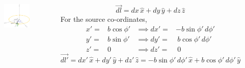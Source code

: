 \documentclass[10pt,aspectratio=169]{beamer}
\begin{document}
	\begin{frame}
		\begin{columns}
			\begin{figure}[!htb]
				\centering
				\includegraphics[scale=0.5]{b-components-dl}
			\end{figure}
			\pause
			\[ \vec{dl} = dx\, \hat{x} + dy\, \hat{y} + dz\, \hat{z} \]
			\pause
			For the source co-ordinates,\pause
			\begin{align*}
				x' =& b\cos\phi' & \implies dx' =& -b\sin\phi'\, d\phi' \\
				y' =& b\sin\phi' & \implies dy' =&\ b\cos\phi'\, d\phi'\\
				z' =& 0 & \implies dz' = &\ 0  
			\end{align*}
			\pause
			\begin{dmath*}
				\vec{dl'} = dx'\, \hat{x} + dy'\, \hat{y} + dz'\, \hat{z}  
				=  -b\sin\phi'\, d\phi' \, \hat{x} + b\cos\phi'\, d\phi' \, \hat{y}
			\end{dmath*}
		\end{columns}
	\end{frame}
\end{document}
